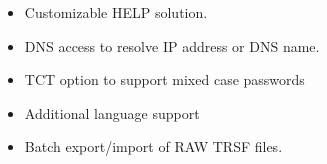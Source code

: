 \documentclass[letterpaper,10pt,english]{sphinxmanual}
\begin{document}
\begin{itemize}
\item {} 
Customizable HELP solution.

\item {} 
DNS access to resolve IP address or DNS name.

\item {} 
TCT option to support mixed case passwords

\item {} 
Additional language support

\item {} 
Batch export/import of RAW TRSF files.

\end{itemize}



\renewcommand{\indexname}{Index}
\printindex
\end{document}
